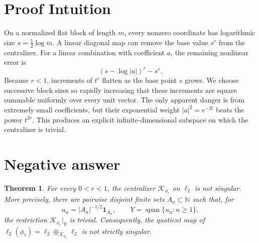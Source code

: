\documentclass[11pt]{article}
\newtheorem{theorem}{Theorem}
\newcommand{\K}{\mathscr K}
\begin{document}
\section{Proof Intuition}

On a normalized flat block of length $m$, every nonzero coordinate has
logarithmic size $s=\frac12\log m$.  A linear diagonal map can remove the base
value $s^r$ from the centralizer.  For a linear combination with coefficient
$a$, the remaining nonlinear error is
\[
 (s-\log|a|)^r-s^r.
\]
Because $r<1$, increments of $t^r$ flatten as the base point $s$ grows.  We
choose successive block sizes so rapidly increasing that these increments are
square summable uniformly over every unit vector.  The only apparent danger is
from extremely small coefficients, but their exponential weight
$|a|^2=e^{-2t}$ beats the power $t^{2r}$.  This produces an explicit
infinite-dimensional subspace on which the centralizer is trivial.

\section{Negative answer}

\begin{theorem}\label{thm:main}
For every $0<r<1$, the centralizer $\K_{\phi_r}$ on $\ell_2$ is not singular.
More precisely, there are pairwise disjoint finite sets $A_n\subset\mathbb N$
such that, for
\[
 u_n=|A_n|^{-1/2}\mathbf 1_{A_n},\qquad
 Y=\overline{\operatorname{span}}\{u_n:n\geq1\},
\]
the restriction $\K_{\phi_r}|_Y$ is trivial.  Consequently, the quotient map
of $\ell_2(\phi_r)=\ell_2\oplus_{\K_{\phi_r}}\ell_2$ is not strictly singular.
\end{theorem}
\end{document}
